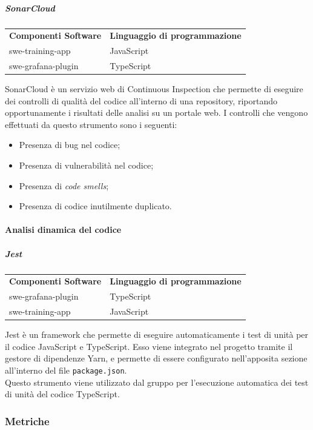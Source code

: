 \documentclass[../norme-di-progetto.tex]{subfiles}
\begin{document}
\subparagraph{SonarCloud}
\begin{table}[H]
\centering
\begin{tabular}{P{8cm}P{8cm}}
  \textbf{Componenti Software}  &  \textbf{Linguaggio di programmazione} \\
  swe-training-app  &   JavaScript \\
  swe-grafana-plugin   &   TypeScript \\
\end{tabular}
\end{table}
SonarCloud è un servizio web di Continuous Inspection che permette di eseguire dei controlli di qualità del codice all'interno di una repository, riportando opportunamente i risultati delle analisi su un portale web. I controlli che vengono effettuati da questo strumento sono i seguenti:
\begin{itemize}
  \item Presenza di bug nel codice;
  \item Presenza di vulnerabilità nel codice;
  \item Presenza di \textit{code smells};
  \item Presenza di codice inutilmente duplicato.
\end{itemize}

\paragraph{Analisi dinamica del codice}

\subparagraph{Jest}
\begin{table}[H]
\centering
\begin{tabular}{P{8cm}P{8cm}}
  \textbf{Componenti Software}  &  \textbf{Linguaggio di programmazione} \\
  swe-grafana-plugin   &   TypeScript \\
  swe-training-app  &   JavaScript \\
\end{tabular}
\end{table}
Jest è un framework che permette di eseguire automaticamente i test di unità per il codice JavaScript e TypeScript. Esso viene integrato nel progetto tramite il gestore di dipendenze Yarn, e permette di essere configurato nell'apposita sezione all'interno del file \texttt{package.json}. \\
Questo strumento viene utilizzato dal gruppo per l'esecuzione automatica dei test di unità del codice TypeScript.

\subsubsection{Metriche}
\end{document}
